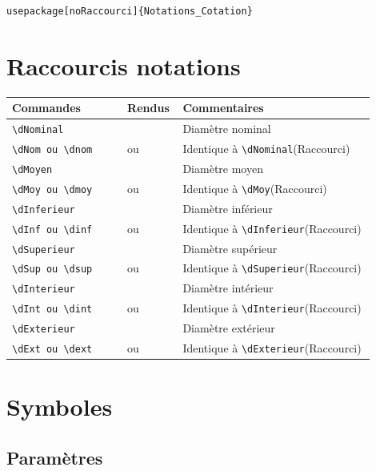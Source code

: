 \documentclass[a4paper,12pt]{article}
\newcommand{\rac}{({\color{red}Raccourci})}
\begin{document}
		\begin{verbatim}
usepackage[noRaccourci]{Notations_Cotation}
		\end{verbatim}


	\section{Raccourcis notations}
		\noindent
		\begin{tabular}{|p{0.3\linewidth}|p{0.1\linewidth}|p{0.5\linewidth}|}
			\hline
				\textbf{Commandes}&\textbf{Rendus}&\textbf{Commentaires}
			\\\hline\hline
				\verb!\dNominal!			&	\dNominal	&	Diamètre nominal
			\\\hline
				\verb!\dNom ou \dnom!			&	\dNom ou \dnom	&	Identique à \verb!\dNominal!\rac
			\\\hline
				\verb!\dMoyen!				&	\dMoyen		&	Diamètre moyen
			\\\hline
				\verb!\dMoy ou \dmoy!			&	\dMoy ou \dmoy	&	Identique à \verb!\dMoy!\rac
			\\\hline
				\verb!\dInferieur!			&	\dInferieur	&	Diamètre inférieur
			\\\hline
				\verb!\dInf ou \dinf!			&	\dInf ou \dinf	&	Identique à \verb!\dInferieur!\rac
			\\\hline
				\verb!\dSuperieur!			&	\dSuperieur	&	Diamètre supérieur
			\\\hline
				\verb!\dSup ou \dsup!			&	\dSup ou \dsup	&	Identique à \verb!\dSuperieur!\rac
			\\\hline
				\verb!\dInterieur!			&	\dInterieur	&	Diamètre intérieur
			\\\hline
				\verb!\dInt ou \dint!			&	\dInt ou \dint	&	Identique à \verb!\dInterieur!\rac
			\\\hline
				\verb!\dExterieur!			&	\dExterieur	&	Diamètre extérieur
			\\\hline
				\verb!\dExt ou \dext!			&	\dExt ou \dext	&	Identique à \verb!\dExterieur!\rac
			\\\hline
		\end{tabular}

	\section{Symboles}

		\subsection{Paramètres}
\end{document}
